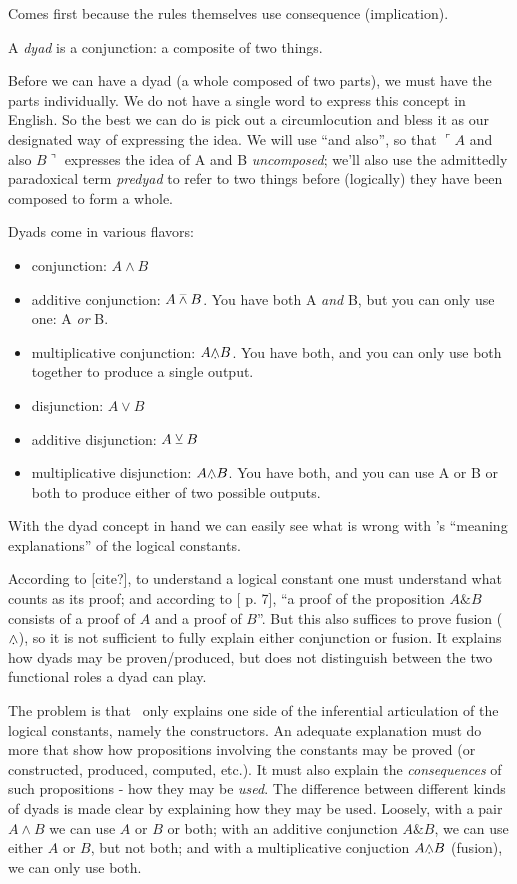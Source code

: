\documentclass{article}
\begin{document}
Comes first because the rules themselves use consequence (implication).

A \textit{dyad} is a conjunction: a composite of two things.

Before we can have a dyad (a whole composed of two parts), we must
have the parts individually. We do not have a single word to express
this concept in English. So the best we can do is pick out a
circumlocution and bless it as our designated way of expressing the
idea. We will use ``and also'', so that \(\ulcorner A\) and also
\(B\urcorner\) expresses the idea of A and B \textit{uncomposed};
we'll also use the admittedly paradoxical term \textit{predyad} to
refer to two things before (logically) they have been composed to form
a whole.

Dyads come in various flavors:

\begin{itemize}
\item conjunction: \(A\land B\)
\item additive conjunction: \(A \barwedge B\). You have both A
  \textit{and} B, but you can only use one: A \textit{or} B.
\item multiplicative conjunction: \(A\fusion B\). You have both, and
  you can only use both together to produce a single output.
\item disjunction: \(A\lor B\)
\item additive disjunction: \(A \veebar B\)
\item multiplicative disjunction: \(A\fusion B\). You have both, and
  you can use A or B or both to produce either of two possible outputs.
\end{itemize}

With the dyad concept in hand we can easily see what is wrong with
\ML's ``meaning explanations'' of the logical constants.

According to [cite?], to understand a logical constant one must
understand what counts as its proof; and according to
[\parencite{martin1984intuitionistic} p. 7], ``a proof of the proposition
\(A\&B\) consists of a proof of \(A\) and a proof of \(B\)''. But this
also suffices to prove fusion (\(\fusion\)), so it is not sufficient
to fully explain either conjunction or fusion. It explains how dyads
may be proven/produced, but does not distinguish between the two functional
roles a dyad can play.

The problem is that \ML\ only explains one side of the inferential
articulation of the logical constants, namely the constructors. An
adequate explanation must do more that show how propositions involving
the constants may be proved (or constructed, produced, computed,
etc.). It must also explain the \textit{consequences} of such
propositions - how they may be \textit{used}. The difference between
different kinds of dyads is made clear by explaining how they may be
used. Loosely, with a pair \(A\land B\) we can use \(A\) or \(B\) or
both; with an additive conjunction \(A\&B\), we can use either \(A\)
or \(B\), but not both; and with a multiplicative conjuction \(A\fusion
B\) (fusion), we can only use both.
\end{document}
